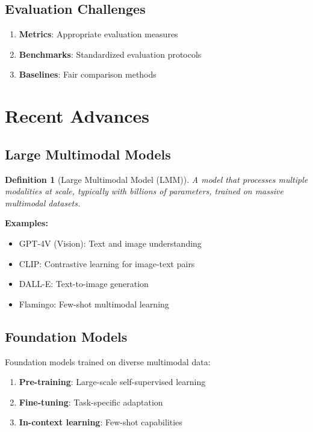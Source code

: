 \documentclass[11pt,a4paper]{article}
\newtheorem{definition}[theorem]{Definition}
\begin{document}
\subsection{Evaluation Challenges}

\begin{enumerate}
\item \textbf{Metrics}: Appropriate evaluation measures
\item \textbf{Benchmarks}: Standardized evaluation protocols
\item \textbf{Baselines}: Fair comparison methods
\end{enumerate}

\section{Recent Advances}

\subsection{Large Multimodal Models}

\begin{definition}[Large Multimodal Model (LMM)]
A model that processes multiple modalities at scale, typically with billions of parameters, trained on massive multimodal datasets.
\end{definition}

\textbf{Examples:}
\begin{itemize}
\item GPT-4V (Vision): Text and image understanding
\item CLIP: Contrastive learning for image-text pairs
\item DALL-E: Text-to-image generation
\item Flamingo: Few-shot multimodal learning
\end{itemize}

\subsection{Foundation Models}

Foundation models trained on diverse multimodal data:

\begin{enumerate}
\item \textbf{Pre-training}: Large-scale self-supervised learning
\item \textbf{Fine-tuning}: Task-specific adaptation
\item \textbf{In-context learning}: Few-shot capabilities
\end{enumerate}
\end{document}
